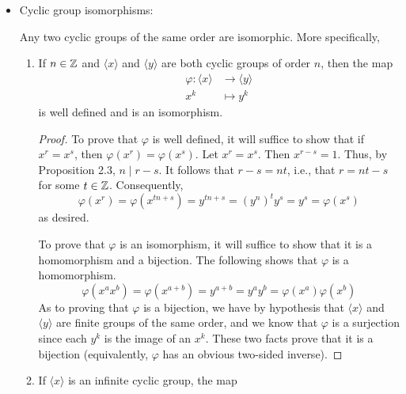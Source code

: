 \documentclass[../notes.tex]{subfiles}
\begin{document}
\begin{itemize}
\begin{proposition}
\begin{proof}
        \end{proof}
    \end{proposition}
    \item Cyclic group isomorphisms:
    \begin{theorem}
        Any two cyclic groups of the same order are isomorphic. More specifically,
        \begin{enumerate}[label={\textup{\textbf{(\arabic*)}}}]
            \item If $n\in\mathbb{Z}$ and $\langle x\rangle$ and $\langle y\rangle$ are both cyclic groups of order $n$, then the map
            \begin{align*}
                \varphi:\langle x\rangle &\to \langle y\rangle\\
                x^k &\mapsto y^k
            \end{align*}
            is well defined and is an isomorphism.
            \begin{proof}
                To prove that $\varphi$ is well defined, it will suffice to show that if $x^r=x^s$, then $\varphi(x^r)=\varphi(x^s)$. Let $x^r=x^s$. Then $x^{r-s}=1$. Thus, by Proposition 2.3, $n\mid r-s$. It follows that $r-s=nt$, i.e., that $r=nt-s$ for some $t\in\mathbb{Z}$. Consequently,
                \begin{equation*}
                    \varphi(x^r) = \varphi(x^{tn+s})
                    = y^{tn+s}
                    = (y^n)^ty^s
                    = y^s
                    = \varphi(x^s)
                \end{equation*}
                as desired.\par
                To prove that $\varphi$ is an isomorphism, it will suffice to show that it is a homomorphism and a bijection. The following shows that $\varphi$ is a homomorphism.
                \begin{equation*}
                    \varphi(x^ax^b) = \varphi(x^{a+b})
                    = y^{a+b}
                    = y^ay^b
                    = \varphi(x^a)\varphi(x^b)
                \end{equation*}
                As to proving that $\varphi$ is a bijection, we have by hypothesis that $\langle x\rangle$ and $\langle y\rangle$ are finite groups of the same order, and we know that $\varphi$ is a surjection since each $y^k$ is the image of an $x^k$. These two facts prove that it is a bijection (equivalently, $\varphi$ has an obvious two-sided inverse).
            \end{proof}
            \item If $\langle x\rangle$ is an infinite cyclic group, the map

\end{enumerate}
\end{theorem}
\end{itemize}
\end{document}

